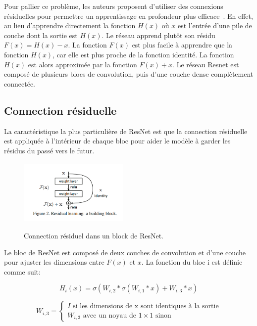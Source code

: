 \documentclass{article}
\begin{document}
Pour pallier ce problème, les auteurs proposent d'utiliser des connexions résiduelles pour permettre un apprentissage en
profondeur plus efficace~\cite{resnet}. En effet, au lieu d'apprendre directement la fonction $H(x)$ où $x$ est l'entrée d'une pile
de couche dont la sortie est $H(x)$. Le réseau apprend
plutôt son résidu $F(x) = H(x) - x$. La fonction $F(x)$ est plus facile à apprendre que la fonction $H(x)$, car elle est
plus proche de la fonction identité. La fonction $H(x)$ est alors approximée par la fonction $F(x) + x$.
Le réseau Resnet est composé de plusieurs blocs de convolution, puis d'une couche dense complètement connectée.

\subsection{Connection résiduelle}
La caractéristique la plus particulière de ResNet est que la connection résiduelle est appliquée à l'intérieur de chaque bloc
pour aider le modèle à garder les résidus du passé vers le futur.

\begin{figure}[h]
    \centering
    \includegraphics[width=150pt,height=90pt]{./img/skip}
    \caption{Connection résiduel dans un block de ResNet.}\cite{resnet}\label{fig: skip}
\end{figure}

Le bloc de ResNet est composé de deux couches de convolution et d'une couche pour ajuster les dimensions entre $F(x)$ et $x$.
La fonction du bloc i est définie comme suit:

\begin{equation}
    H_i(x) = \sigma(W_{i,2} * \sigma(W_{i,1} * x) + W_{i,3} * x)
\end{equation}

\begin{equation}
    W_{i, 3} =
    \begin{cases}
        I \text{ si les dimensions de x sont identiques à la sortie} \\
        W_{i, 3}\text{ avec un noyau de } 1\times1 \text{ sinon}
    \end{cases}
\end{equation}
\end{document}
